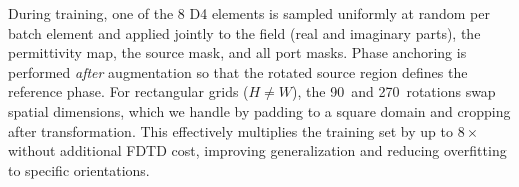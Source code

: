 During training, one of the 8 D4 elements is sampled uniformly at random per batch element and applied jointly to the
field (real and imaginary parts), the permittivity map, the source mask, and all port masks. Phase anchoring is
performed \emph{after} augmentation so that the rotated source region defines the reference phase. For rectangular
grids ($H \neq W$), the 90\textdegree\ and 270\textdegree\ rotations swap spatial dimensions, which we handle by
padding to a square domain and cropping after transformation. This effectively multiplies the training set by up to
$8\times$ without additional FDTD cost, improving generalization and reducing overfitting to specific
orientations.
